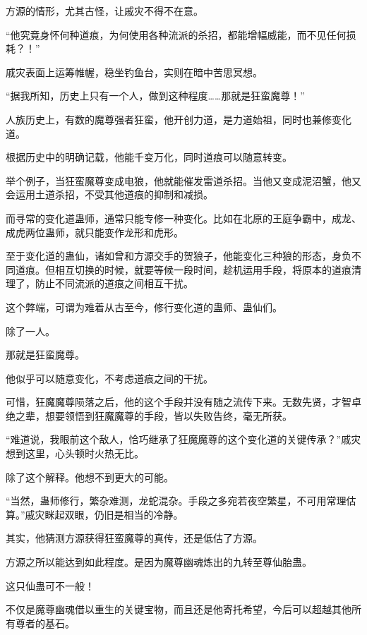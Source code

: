 
\begin{this_body}

方源的情形，尤其古怪，让戚灾不得不在意。

“他究竟身怀何种道痕，为何使用各种流派的杀招，都能增幅威能，而不见任何损耗？！”

戚灾表面上运筹帷幄，稳坐钓鱼台，实则在暗中苦思冥想。

“据我所知，历史上只有一个人，做到这种程度……那就是狂蛮魔尊！”

人族历史上，有数的魔尊强者狂蛮，他开创力道，是力道始祖，同时也兼修变化道。

根据历史中的明确记载，他能千变万化，同时道痕可以随意转变。

举个例子，当狂蛮魔尊变成电狼，他就能催发雷道杀招。当他又变成泥沼蟹，他又会运用土道杀招，不受其他道痕的抑制和减损。

而寻常的变化道蛊师，通常只能专修一种变化。比如在北原的王庭争霸中，成龙、成虎两位蛊师，就只能变作龙形和虎形。

至于变化道的蛊仙，诸如曾和方源交手的贺狼子，他能变化三种狼的形态，身负不同道痕。但相互切换的时候，就要等候一段时间，趁机运用手段，将原本的道痕清理了，防止不同流派的道痕之间相互干扰。

这个弊端，可谓为难着从古至今，修行变化道的蛊师、蛊仙们。

除了一人。

那就是狂蛮魔尊。

他似乎可以随意变化，不考虑道痕之间的干扰。

可惜，狂魔魔尊陨落之后，他的这个手段并没有随之流传下来。无数先贤，才智卓绝之辈，想要领悟到狂魔魔尊的手段，皆以失败告终，毫无所获。

“难道说，我眼前这个敌人，恰巧继承了狂魔魔尊的这个变化道的关键传承？”戚灾想到这里，心头顿时火热无比。

除了这个解释。他想不到更大的可能。

“当然，蛊师修行，繁杂难测，龙蛇混杂。手段之多宛若夜空繁星，不可用常理估算。”戚灾眯起双眼，仍旧是相当的冷静。

其实，他猜测方源获得狂蛮魔尊的真传，还是低估了方源。

方源之所以能达到如此程度。是因为魔尊幽魂炼出的九转至尊仙胎蛊。

这只仙蛊可不一般！

不仅是魔尊幽魂借以重生的关键宝物，而且还是他寄托希望，今后可以超越其他所有尊者的基石。


\end{this_body}
